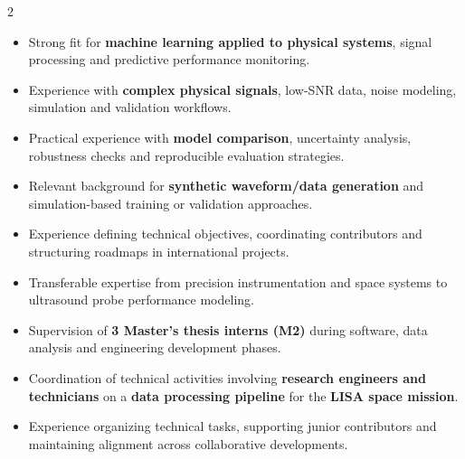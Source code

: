 \documentclass[8pt,a4paper,ragged2e,withhyper]{altacv}
\begin{document}
\begin{paracol}{2}
\begin{itemize}
  \item Strong fit for \textbf{machine learning applied to physical systems}, signal processing and predictive performance monitoring.
  \item Experience with \textbf{complex physical signals}, low-SNR data, noise modeling, simulation and validation workflows.
  \item Practical experience with \textbf{model comparison}, uncertainty analysis, robustness checks and reproducible evaluation strategies.
  \item Relevant background for \textbf{synthetic waveform/data generation} and simulation-based training or validation approaches.
  \item Experience defining technical objectives, coordinating contributors and structuring roadmaps in international projects.
  \item Transferable expertise from precision instrumentation and space systems to ultrasound probe performance modeling.
\end{itemize}


\begin{itemize}
  \item Supervision of \textbf{3 Master’s thesis interns (M2)} during software, data analysis and engineering development phases.
  \item Coordination of technical activities involving \textbf{research engineers and technicians} on a \textbf{data processing pipeline} for the \textbf{LISA space mission}.
  \item Experience organizing technical tasks, supporting junior contributors and maintaining alignment across collaborative developments.
\end{itemize}


\divider

\divider

\medskip


\divider

\divider

\divider




\end{paracol}
\end{document}
